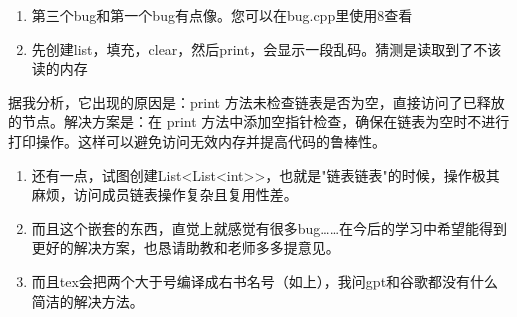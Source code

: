 \documentclass[UTF8]{ctexart}
\begin{document}
\begin{enumerate}
    \item 第三个bug和第一个bug有点像。您可以在bug.cpp里使用8查看
    \item 先创建list，填充，clear，然后print，会显示一段乱码。猜测是读取到了不该读的内存
\end{enumerate}

据我分析，它出现的原因是：print 方法未检查链表是否为空，直接访问了已释放的节点。解决方案是：在 print 方法中添加空指针检查，确保在链表为空时不进行打印操作。这样可以避免访问无效内存并提高代码的鲁棒性。

\begin{enumerate}
    \item 还有一点，试图创建List<List<int>>，也就是"链表链表"的时候，操作极其麻烦，访问成员链表操作复杂且复用性差。  
    \item 而且这个嵌套的东西，直觉上就感觉有很多bug……在今后的学习中希望能得到更好的解决方案，也恳请助教和老师多多提意见。  
    \item 而且tex会把两个大于号编译成右书名号（如上），我问gpt和谷歌都没有什么简洁的解决方法。
\end{enumerate}
\end{document}
